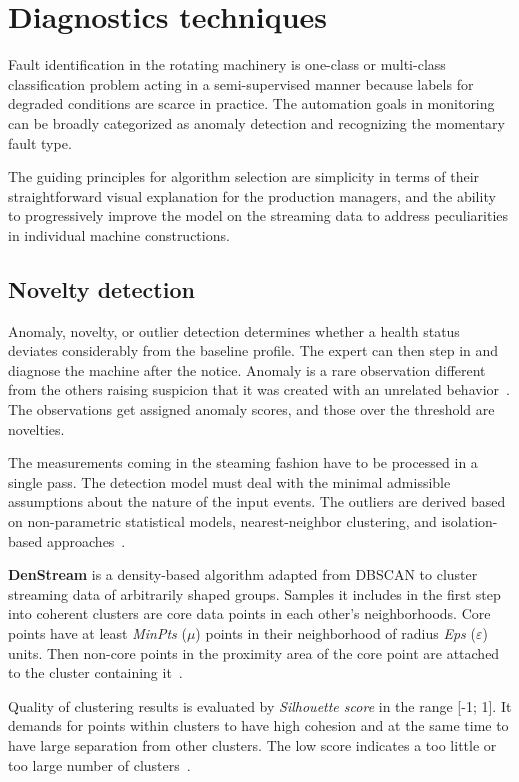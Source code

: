\section{Diagnostics techniques} \label{section:diagnostics-techniques}
Fault identification in the rotating machinery is one-class or multi-class classification problem acting in a semi-supervised manner because labels for degraded conditions are scarce in practice. The automation goals in monitoring can be broadly categorized as anomaly detection and recognizing the momentary fault type.

The guiding principles for algorithm selection are simplicity in terms of their straightforward visual explanation for the production managers, and the ability to progressively improve the model on the streaming data to address peculiarities in individual machine constructions.

\subsection{Novelty detection}
Anomaly, novelty, or outlier detection determines whether a health status deviates considerably from the baseline profile. The expert can then step in and diagnose the machine after the notice. Anomaly is a rare observation different from the others raising suspicion that it was created with an unrelated behavior~\cite{aggarwal_outlier_2016}. The observations get assigned anomaly scores, and those over the threshold are novelties.

The measurements coming in the steaming fashion have to be processed in a single pass. The detection model must deal with the minimal admissible assumptions about the nature of the input events. The outliers are derived based on non-parametric statistical models, nearest-neighbor clustering, and isolation-based approaches~\cite{gervasi_anomaly_2020}.
\bigbreak

\textbf{DenStream} is a density-based algorithm adapted from DBSCAN to cluster streaming data of arbitrarily shaped groups. Samples it includes in the first step into coherent clusters are core data points in each other's neighborhoods. Core points have at least \emph{MinPts} ($\mu$) points in their neighborhood of radius \emph{Eps} ($\varepsilon$) units. Then non-core points in the proximity area of the core point are attached to the cluster containing it~\cite{aggarwal_data_2014}.

Quality of clustering results is evaluated by \emph{Silhouette score} in the range [-1; 1]. It demands for points within clusters to have high cohesion and at the same time to have large separation from other clusters. The low score indicates a too little or too large number of clusters~\cite{rousseeuw_rousseeuw_1987}. 


